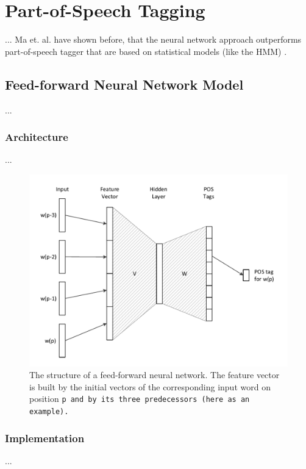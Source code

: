 \chapter{Part-of-Speech Tagging}\label{c.postagging}
...
Ma et. al. have shown before, that the neural network approach outperforms part-of-speech tagger that are based on statistical models (like the HMM) \cite{ma2000}.

\section{Feed-forward Neural Network Model}\label{c.postagging.fnn}
...

\subsection{Architecture}\label{c.postagging.fnn.architecture}
...

\begin{figure}[H]
	\includegraphics[width=\textwidth]{images/fnn_structure}
	\caption[Structure of a Feed-forward Neural Network]{The structure of a feed-forward neural network. The feature vector is built by the initial vectors of the corresponding input word on position \tt{p} and by its three predecessors (here as an example).}
	\label{f.fnn_structure}
\end{figure}

\subsection{Implementation}\label{c.postagging.fnn.implementation}
...


